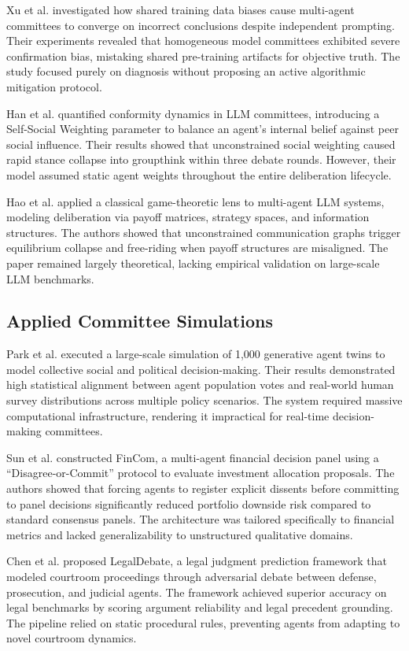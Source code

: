 \documentclass[a4paper,fleqn]{cas-sc}
\begin{document}
Xu et al. \cite{25} investigated how shared training data biases cause multi-agent committees to converge on incorrect conclusions despite independent prompting. Their experiments revealed that homogeneous model committees exhibited severe confirmation bias, mistaking shared pre-training artifacts for objective truth. The study focused purely on diagnosis without proposing an active algorithmic mitigation protocol.

Han et al. \cite{26} quantified conformity dynamics in LLM committees, introducing a Self-Social Weighting parameter to balance an agent's internal belief against peer social influence. Their results showed that unconstrained social weighting caused rapid stance collapse into groupthink within three debate rounds. However, their model assumed static agent weights throughout the entire deliberation lifecycle.

Hao et al. \cite{38} applied a classical game-theoretic lens to multi-agent LLM systems, modeling deliberation via payoff matrices, strategy spaces, and information structures. The authors showed that unconstrained communication graphs trigger equilibrium collapse and free-riding when payoff structures are misaligned. The paper remained largely theoretical, lacking empirical validation on large-scale LLM benchmarks.

\subsection{Applied Committee Simulations}
Park et al. \cite{13} executed a large-scale simulation of 1,000 generative agent twins to model collective social and political decision-making. Their results demonstrated high statistical alignment between agent population votes and real-world human survey distributions across multiple policy scenarios. The system required massive computational infrastructure, rendering it impractical for real-time decision-making committees.

Sun et al. \cite{27} constructed FinCom, a multi-agent financial decision panel using a ``Disagree-or-Commit'' protocol to evaluate investment allocation proposals. The authors showed that forcing agents to register explicit dissents before committing to panel decisions significantly reduced portfolio downside risk compared to standard consensus panels. The architecture was tailored specifically to financial metrics and lacked generalizability to unstructured qualitative domains.

Chen et al. \cite{28} proposed LegalDebate, a legal judgment prediction framework that modeled courtroom proceedings through adversarial debate between defense, prosecution, and judicial agents. The framework achieved superior accuracy on legal benchmarks by scoring argument reliability and legal precedent grounding. The pipeline relied on static procedural rules, preventing agents from adapting to novel courtroom dynamics.
\end{document}

